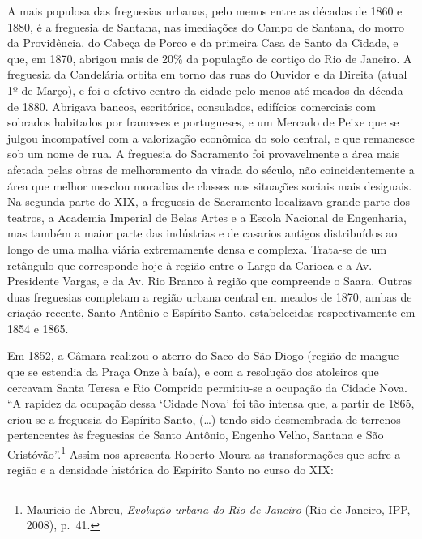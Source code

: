 A mais populosa das freguesias urbanas, pelo menos entre as décadas de
1860 e 1880, é a freguesia de Santana, nas imediações do Campo de
Santana, do morro da Providência, do Cabeça de Porco e da primeira Casa
de Santo da Cidade, e que, em 1870, abrigou mais de 20\% da população de
cortiço do Rio de Janeiro. A freguesia da Candelária orbita em torno das
ruas do Ouvidor e da Direita (atual 1º de Março), e foi o efetivo centro
da cidade pelo menos até meados da década de 1880. Abrigava bancos,
escritórios, consulados, edifícios comerciais com sobrados habitados por
franceses e portugueses, e um Mercado de Peixe que se julgou
incompatível com a valorização econômica do solo central, e que
remanesce sob um nome de rua. A freguesia do Sacramento foi
provavelmente a área mais afetada pelas obras de melhoramento da virada
do século, não coincidentemente a área que melhor mesclou moradias de
classes nas situações sociais mais desiguais. Na segunda parte do XIX, a
freguesia de Sacramento localizava grande parte dos teatros, a Academia
Imperial de Belas Artes e a Escola Nacional de Engenharia, mas também a
maior parte das indústrias e de casarios antigos distribuídos ao longo
de uma malha viária extremamente densa e complexa. Trata-se de um
retângulo que corresponde hoje à região entre o Largo da Carioca e a Av.
Presidente Vargas, e da Av. Rio Branco à região que compreende o Saara.
Outras duas freguesias completam a região urbana central em meados de
1870, ambas de criação recente, Santo Antônio e Espírito Santo,
estabelecidas respectivamente em 1854 e 1865.

Em 1852, a Câmara realizou o aterro do Saco do São Diogo (região de
mangue que se estendia da Praça Onze à baía), e com a resolução dos
atoleiros que cercavam Santa Teresa e Rio Comprido permitiu-se a
ocupação da Cidade Nova. ``A rapidez da ocupação dessa `Cidade Nova' foi
tão intensa que, a partir de 1865, criou-se a freguesia do Espírito
Santo, (\ldots{}) tendo sido desmembrada de terrenos pertencentes às
freguesias de Santo Antônio, Engenho Velho, Santana e São
Cristóvão''.\footnote{Mauricio de Abreu, \textit{Evolução urbana do Rio de
  Janeiro} (Rio de Janeiro, IPP, 2008), p.~41.} Assim nos apresenta
Roberto Moura as transformações que sofre a região e a densidade
histórica do Espírito Santo no curso do XIX:

